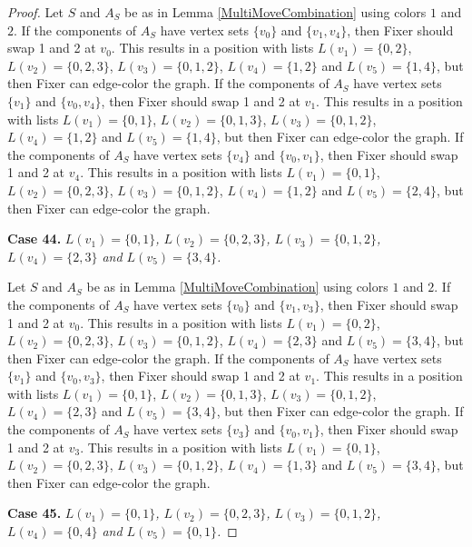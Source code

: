 \documentclass[12pt]{amsart}
\theoremstyle{plain}
\theoremstyle{definition}
\theoremstyle{remark}
\begin{document}
\begin{proof}
Let $S$ and $A_S$ be as in Lemma \ref{MultiMoveCombination} using colors $1$ and $2$. If the components of $A_S$ have vertex sets $\{v_0\}$ and $\{v_1, v_4\}$, then Fixer should swap 1 and 2 at $v_0$. This results in a position with lists $L(v_1) = \{0, 2\}$, $L(v_2) = \{0, 2, 3\}$, $L(v_3) = \{0, 1, 2\}$, $L(v_4) = \{1, 2\}$ and $L(v_5) = \{1, 4\}$, but then Fixer can edge-color the graph.
If the components of $A_S$ have vertex sets $\{v_1\}$ and $\{v_0, v_4\}$, then Fixer should swap 1 and 2 at $v_1$. This results in a position with lists $L(v_1) = \{0, 1\}$, $L(v_2) = \{0, 1, 3\}$, $L(v_3) = \{0, 1, 2\}$, $L(v_4) = \{1, 2\}$ and $L(v_5) = \{1, 4\}$, but then Fixer can edge-color the graph.
If the components of $A_S$ have vertex sets $\{v_4\}$ and $\{v_0, v_1\}$, then Fixer should swap 1 and 2 at $v_4$. This results in a position with lists $L(v_1) = \{0, 1\}$, $L(v_2) = \{0, 2, 3\}$, $L(v_3) = \{0, 1, 2\}$, $L(v_4) = \{1, 2\}$ and $L(v_5) = \{2, 4\}$, but then Fixer can edge-color the graph.

\noindent\textbf{Case 44.  }\textit{$L(v_1) = \{0, 1\}$, $L(v_2) = \{0, 2, 3\}$, $L(v_3) = \{0, 1, 2\}$, $L(v_4) = \{2, 3\}$ and $L(v_5) = \{3, 4\}$.}

Let $S$ and $A_S$ be as in Lemma \ref{MultiMoveCombination} using colors $1$ and $2$. If the components of $A_S$ have vertex sets $\{v_0\}$ and $\{v_1, v_3\}$, then Fixer should swap 1 and 2 at $v_0$. This results in a position with lists $L(v_1) = \{0, 2\}$, $L(v_2) = \{0, 2, 3\}$, $L(v_3) = \{0, 1, 2\}$, $L(v_4) = \{2, 3\}$ and $L(v_5) = \{3, 4\}$, but then Fixer can edge-color the graph.
If the components of $A_S$ have vertex sets $\{v_1\}$ and $\{v_0, v_3\}$, then Fixer should swap 1 and 2 at $v_1$. This results in a position with lists $L(v_1) = \{0, 1\}$, $L(v_2) = \{0, 1, 3\}$, $L(v_3) = \{0, 1, 2\}$, $L(v_4) = \{2, 3\}$ and $L(v_5) = \{3, 4\}$, but then Fixer can edge-color the graph.
If the components of $A_S$ have vertex sets $\{v_3\}$ and $\{v_0, v_1\}$, then Fixer should swap 1 and 2 at $v_3$. This results in a position with lists $L(v_1) = \{0, 1\}$, $L(v_2) = \{0, 2, 3\}$, $L(v_3) = \{0, 1, 2\}$, $L(v_4) = \{1, 3\}$ and $L(v_5) = \{3, 4\}$, but then Fixer can edge-color the graph.

\noindent\textbf{Case 45.  }\textit{$L(v_1) = \{0, 1\}$, $L(v_2) = \{0, 2, 3\}$, $L(v_3) = \{0, 1, 2\}$, $L(v_4) = \{0, 4\}$ and $L(v_5) = \{0, 1\}$.}


\end{proof}
\end{document}
